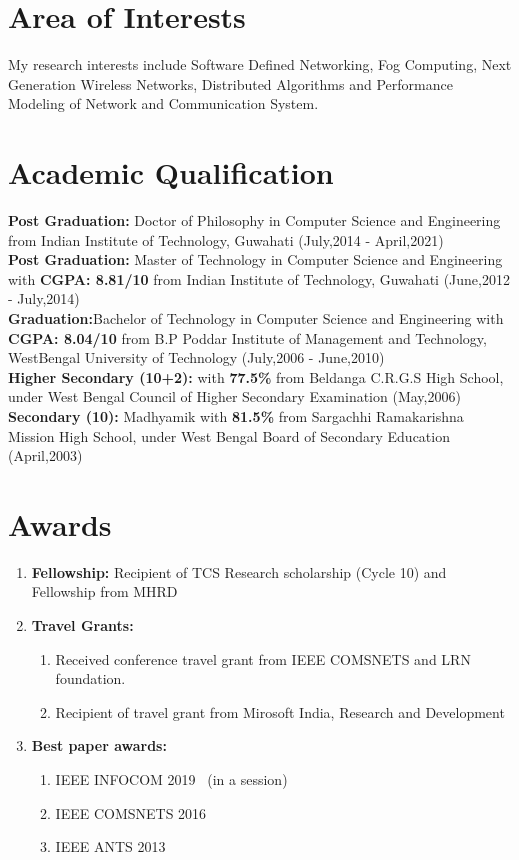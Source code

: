 \documentclass{article}
\begin{document}
\section{Area of Interests}    
 		My research interests include Software Defined Networking, Fog Computing, Next Generation Wireless Networks, Distributed Algorithms and Performance Modeling of Network and Communication System.
\section{Academic Qualification} 
	{\bf Post Graduation:} Doctor  of Philosophy in Computer Science and Engineering from Indian Institute of Technology, Guwahati (July,2014 - April,2021)\\[3ex]
	{\bf Post Graduation:} Master of Technology in Computer Science and Engineering with {\bf CGPA: 8.81/10} from Indian Institute of Technology, Guwahati (June,2012 - July,2014)\\[3ex]
	{\bf Graduation:}Bachelor of Technology in Computer Science and Engineering with {\bf CGPA: 8.04/10} from B.P Poddar Institute of Management and Technology, WestBengal University of Technology (July,2006 - June,2010)\\[3ex]
	{\bf Higher Secondary (10+2):} with {\bf 77.5\%} from Beldanga C.R.G.S High School, under West Bengal Council of Higher Secondary Examination (May,2006)\\[3ex]
	{\bf Secondary (10):} Madhyamik with {\bf 81.5\%} from Sargachhi Ramakarishna Mission High School, under West Bengal Board of Secondary Education (April,2003)
\section{Awards}
	\begin{enumerate}
		\item{\bf Fellowship:} Recipient of TCS Research scholarship (Cycle 10) and Fellowship from MHRD
		\item {\bf Travel Grants:} 
			\begin{enumerate}
				\item Received conference travel grant from IEEE COMSNETS and LRN foundation.
				\item Recipient of travel grant from Mirosoft India, Research and Development
			\end{enumerate}
		\item {\bf Best paper awards:} 
			\begin{enumerate}
				\item IEEE INFOCOM 2019~\cite{chattopadhyay2018aloe} (in a session)
				\item IEEE COMSNETS 2016~\cite{chakraborty2016es2}
				\item IEEE ANTS 2013~\cite{chakraborty2013surpassing}
			\end{enumerate}
	\end{enumerate}
\end{document}
